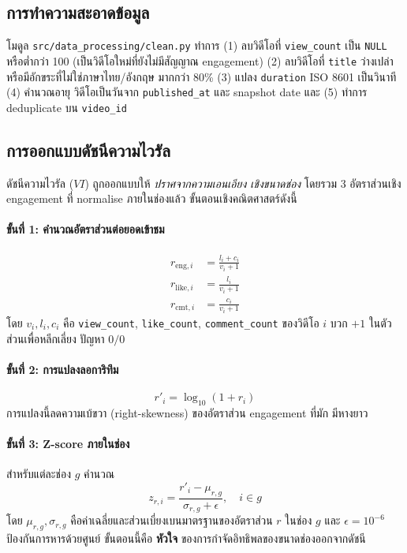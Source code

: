 \subsection{การทำความสะอาดข้อมูล}

โมดูล \texttt{src/data\_processing/clean.py} ทำการ (1) ลบวิดีโอที่ \texttt{view\_count}
เป็น \texttt{NULL} หรือต่ำกว่า 100 (เป็นวิดีโอใหม่ที่ยังไม่มีสัญญาณ engagement)
(2) ลบวิดีโอที่ \texttt{title} ว่างเปล่าหรือมีอักขระที่ไม่ใช่ภาษาไทย/อังกฤษ
มากกว่า 80\% (3) แปลง \texttt{duration} ISO 8601 เป็นวินาที (4) คำนวณอายุ
วิดีโอเป็นวันจาก \texttt{published\_at} และ snapshot date และ (5) ทำการ
deduplicate บน \texttt{video\_id}

\subsection{การออกแบบดัชนีความไวรัล}
\label{sec:method-vi}

ดัชนีความไวรัล ($\mathit{VI}$) ถูกออกแบบให้ \emph{ปราศจากความเอนเอียง
เชิงขนาดช่อง} โดยรวม 3 อัตราส่วนเชิง engagement ที่ normalise ภายในช่องแล้ว
ขั้นตอนเชิงคณิตศาสตร์ดังนี้

\paragraph{ขั้นที่ 1: คำนวณอัตราส่วนต่อยอดเข้าชม}
\begin{align}
r_{\text{eng},i}    &= \frac{l_i + c_i}{v_i + 1} \label{eq:r-eng} \\
r_{\text{like},i}   &= \frac{l_i}{v_i + 1}        \label{eq:r-like} \\
r_{\text{cmt},i}    &= \frac{c_i}{v_i + 1}        \label{eq:r-cmt}
\end{align}
โดย $v_i, l_i, c_i$ คือ \texttt{view\_count}, \texttt{like\_count},
\texttt{comment\_count} ของวิดีโอ $i$ บวก $+1$ ในตัวส่วนเพื่อหลีกเลี่ยง
ปัญหา $0/0$

\paragraph{ขั้นที่ 2: การแปลงลอการิทึม}
\begin{equation}
r'_i = \log_{10}(1 + r_i)
\label{eq:logtrans}
\end{equation}
การแปลงนี้ลดความเบ้ขวา (right-skewness) ของอัตราส่วน engagement ที่มัก
มีหางยาว

\paragraph{ขั้นที่ 3: Z-score ภายในช่อง}
สำหรับแต่ละช่อง $g$ คำนวณ
\begin{equation}
z_{r,i} = \frac{r'_i - \mu_{r,g}}{\sigma_{r,g} + \epsilon},
\quad i \in g
\label{eq:zscore}
\end{equation}
โดย $\mu_{r,g}, \sigma_{r,g}$ คือค่าเฉลี่ยและส่วนเบี่ยงเบนมาตรฐานของอัตราส่วน
$r$ ในช่อง $g$ และ $\epsilon = 10^{-6}$ ป้องกันการหารด้วยศูนย์ ขั้นตอนนี้คือ
\textbf{หัวใจ} ของการกำจัดอิทธิพลของขนาดช่องออกจากดัชนี

